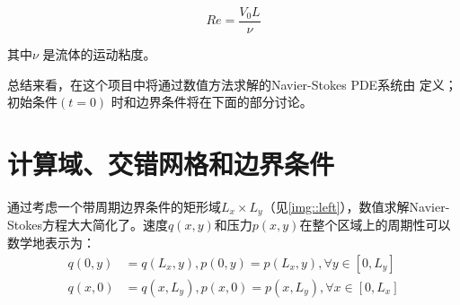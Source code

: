 \documentclass[12pt, a4paper]{article}
\numberwithin{equation}{section} %
\begin{document}
\begin{equation}
Re = \frac{V_0L}{\nu}
\end{equation}

其中$\nu$ 是流体的运动粘度。

总结来看，在这个项目中将通过数值方法求解的Navier-Stokes PDE系统由
定义；初始条件$(t = 0)$ 时和边界条件将在下面的部分讨论。




\newpage
\section{计算域、交错网格和边界条件}
\label{sec:b}
通过考虑一个带周期边界条件的矩形域$ L_x \times L_y$（见\ref{img::left}），数值求解Navier-Stokes方程大大简化了。速度$ q(x, y) $和压力$ p(x, y) $在整个区域上的周期性可以数学地表示为：
\begin{equation}
\begin{aligned}
q(0, y) &= q(L_x, y),p(0, y) = p(L_x, y),\forall y \in \left[ 0,L_y\right] \\
q(x, 0) &= q(x, L_y),p(x, 0) = p(x, L_y),\forall x \in  \left[0, L_x\right] \\
\end{aligned}
\end{equation}
\end{document}
